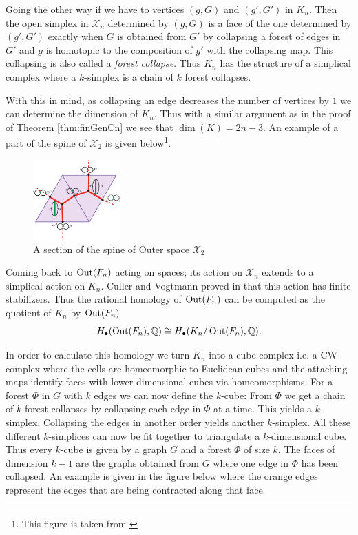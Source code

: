 Going the other way if we have to vertices $(g,G)$ and $(g',G')$ in $K_{n}$. Then the open simplex in $\mathcal{X}_{n}$ 
determined by $(g,G)$ is a face of  the one determined by $(g',G')$ exactly when $G$ is obtained from $G'$ 
by collapsing a forest of edges in $G'$ and  $g$ is homotopic to the composition of $g'$ with the collapsing map.
This collapsing is also called a \emph{forest collapse}.
Thus $K_{n}$ has the structure of a simplical complex where a $k$-simplex is a chain of $k$ forest collapses. 

With this in mind, as collapsing an edge decreases the number of vertices by $1$ we can determine the dimension of $K_{n}$.
Thus with a similar argument as in the proof of Theorem \ref{thm:finGenCn} we see that $\dim(K) = 2n -3$.
An example of a part of the spine of $\mathcal{X}_{2}$ is given below\footnote{This figure is taken from \cite{vogtmann02}}. 

\begin{figure}[h]
	\centering
	\includegraphics[width=0.3\textwidth]{./Images/spineOfOuterSpace.pdf}
	\caption{A section of the spine of Outer space $\mathcal{X}_{2}$}
\end{figure}

Coming back to $\operatorname{Out}(F_{n})$ acting on spaces; its action on $\mathcal{X}_{n}$ extends to a simplical action on $K_{n}$.
Culler and Vogtmann proved in \cite{vogtmann86} that this action has finite stabilizers.
Thus the rational homology of $\operatorname{Out}(F_{n})$ can be computed as the quotient of $K_{n}$ by $\operatorname{Out}(F_{n})$
\[
	H_{\bullet}(\operatorname{Out}(F_{n}),\mathbb{Q}) \cong H_{\bullet}(K_{n}/ \operatorname{Out}(F_{n}),\mathbb{Q})
.\] 

In order to calculate this homology we turn $K_{n}$ into a cube complex i.e. a CW-complex where the cells are homeomorphic
to Euclidean cubes and the attaching maps identify faces with lower dimensional cubes via homeomorphisms.
For a forest $\Phi$ in $G$ with $k$ edges we can now define the $k$-cube:
From $\Phi$ we get a chain of $k$-forest collapses by collapsing each edge in $\Phi$ at a time.
This yields a $k$-simplex. Collapsing the edges in another order yields another $k$-simplex.
All these different $k$-simplices can now be fit together to triangulate a $k$-dimensional cube.
Thus every $k$-cube is given by a graph $G$ and a forest $\Phi$ of size $k$.
The faces of dimension $k-1$ are the graphs obtained from $G$ where one edge in $\Phi$ has been collapsed.
An example is given in the figure below where the orange edges represent the edges that are being contracted along that face.


